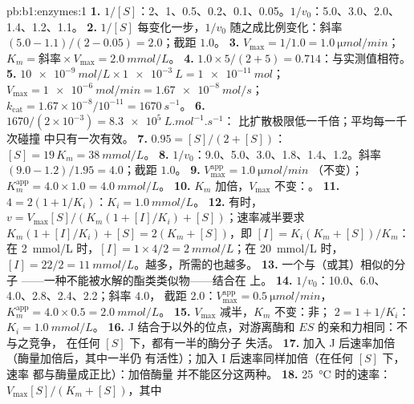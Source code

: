 \begin{solution}{pb:b1:enzymes:1}
\textbf{1.} $1/[S]$：2、1、0.5、0.2、0.1、0.05。$1/v_0$：5.0、3.0、2.0、
1.4、1.2、1.1。
\textbf{2.} $1/[S]$ 每变化一步，$1/v_0$ 随之成比例变化：斜率
$(5.0 - 1.1)/(2 - 0.05) = 2.0$；截距 $1.0$。
\textbf{3.} $V_{\max} = 1/1.0 = \qty{1.0}{\micro mol/min}$；$K_m =
\text{斜率}\times V_{\max} = \qty{2.0}{mmol/L}$。
\textbf{4.} $1.0\times 5/(2 + 5) = 0.714$：与实测值相符。
\textbf{5.} $\qty{10e-9}{mol/L}\times\qty{1e-3}{L} = \qty{1e-11}{mol}$；
$V_{\max} = \qty{1e-6}{mol/min} = \qty{1.67e-8}{mol/s}$；
$k_{\text{cat}} = 1.67\times 10^{-8}/10^{-11} = \qty{1670}{s^{-1}}$。
\textbf{6.} $1670/(2\times 10^{-3}) = \qty{8.3e5}{L.mol^{-1}.s^{-1}}$：
比扩散极限低一千倍；平均每一千次碰撞
中只有一次有效。
\textbf{7.} $0.95 = [S]/(2 + [S])$：$[S] = 19\,K_m = \qty{38}{mmol/L}$。
\textbf{8.} $1/v_0$：9.0、5.0、3.0、1.8、1.4、1.2。斜率 $(9.0 -
1.2)/1.95 = 4.0$；截距 $1.0$。
\textbf{9.} $V_{\max}^{\text{app}} = \qty{1.0}{\micro mol/min}$
（不变）；$K_m^{\text{app}} = 4.0\times 1.0 = \qty{4.0}{mmol/L}$。
\textbf{10.} $K_m$ 加倍，$V_{\max}$ 不变：。
\textbf{11.} $4 = 2(1 + 1/K_i)$：$K_i = \qty{1.0}{mmol/L}$。
\textbf{12.} 有时，$v = V_{\max}[S]/(K_m(1 + [I]/K_i) +
[S])$；速率减半要求 $K_m(1 + [I]/K_i) + [S] = 2(K_m +
[S])$，即 $[I] = K_i(K_m + [S])/K_m$：在 \qty{2}{mmol/L} 时，$[I] =
1\times 4/2 = \qty{2}{mmol/L}$；在 \qty{20}{mmol/L} 时，$[I] = 22/2 =
\qty{11}{mmol/L}$。越多，所需的也越多。
\textbf{13.} 一个与（或其）相似的分子
——一种不能被水解的酯类类似物——结合在
上。
\textbf{14.} $1/v_0$：10.0、6.0、4.0、2.8、2.4、2.2；斜率 $4.0$，
截距 $2.0$：$V_{\max}^{\text{app}} = \qty{0.5}{\micro mol/min}$，
$K_m^{\text{app}} = 4.0\times 0.5 = \qty{2.0}{mmol/L}$。
\textbf{15.} $V_{\max}$ 减半，$K_m$ 不变：非；
$2 = 1 + 1/K_i$：$K_i = \qty{1.0}{mmol/L}$。
\textbf{16.} J 结合于以外的位点，对游离酶和
$ES$ 的亲和力相同：不与之竞争，
在任何 $[S]$ 下，都有一半的酶分子
失活。
\textbf{17.} 加入 J 后速率加倍（酶量加倍后，其中一半仍
有活性）；加入 I 后速率同样加倍（在任何 $[S]$ 下，速率
都与酶量成正比）：加倍酶量
并不能区分这两种。
\textbf{18.} \qty{25}{\celsius} 时的速率：$V_{\max}[S]/(K_m + [S])$，其中

\end{solution}
